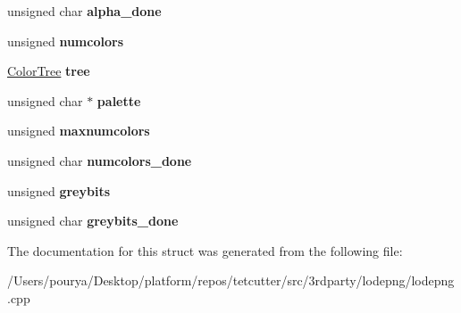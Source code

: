 \begin{DoxyCompactItemize}
\item 
\hypertarget{structColorProfile_a9c8071d69a1a7a7015f3d880ed9faf8b}{}unsigned char {\bfseries alpha\+\_\+done}\label{structColorProfile_a9c8071d69a1a7a7015f3d880ed9faf8b}

\item 
\hypertarget{structColorProfile_ac38cbfa9237ecaf21cb56730c0c15e19}{}unsigned {\bfseries numcolors}\label{structColorProfile_ac38cbfa9237ecaf21cb56730c0c15e19}

\item 
\hypertarget{structColorProfile_ad64583d868f74ccd5bda6f94b7bd0a6d}{}\hyperlink{structColorTree}{Color\+Tree} {\bfseries tree}\label{structColorProfile_ad64583d868f74ccd5bda6f94b7bd0a6d}

\item 
\hypertarget{structColorProfile_acf805bc910a23088e71d4cb04dcaf3df}{}unsigned char $\ast$ {\bfseries palette}\label{structColorProfile_acf805bc910a23088e71d4cb04dcaf3df}

\item 
\hypertarget{structColorProfile_a2edd65be07c3c028a58329e570264980}{}unsigned {\bfseries maxnumcolors}\label{structColorProfile_a2edd65be07c3c028a58329e570264980}

\item 
\hypertarget{structColorProfile_a7a0f6fe120d02e4573d2c27be20715cb}{}unsigned char {\bfseries numcolors\+\_\+done}\label{structColorProfile_a7a0f6fe120d02e4573d2c27be20715cb}

\item 
\hypertarget{structColorProfile_a1a1aefe1c04cff8ede43e12b92429519}{}unsigned {\bfseries greybits}\label{structColorProfile_a1a1aefe1c04cff8ede43e12b92429519}

\item 
\hypertarget{structColorProfile_af3825b320146425e402d7ae42bfaa63e}{}unsigned char {\bfseries greybits\+\_\+done}\label{structColorProfile_af3825b320146425e402d7ae42bfaa63e}

\end{DoxyCompactItemize}


The documentation for this struct was generated from the following file\+:\begin{DoxyCompactItemize}
\item 
/\+Users/pourya/\+Desktop/platform/repos/tetcutter/src/3rdparty/lodepng/lodepng.\+cpp\end{DoxyCompactItemize}

